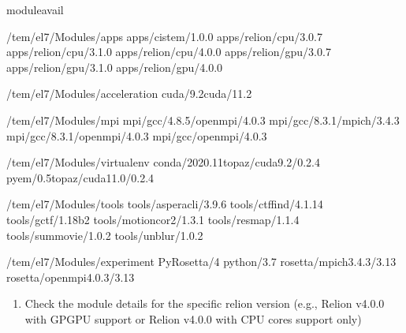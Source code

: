 \documentclass[a4paper,10pt,english]{sphinxmanual}
\begin{document}
\begin{sphinxVerbatim}[commandchars=\\\{\}]
\PYGZdl{}\PYGZgt{}moduleavail

\PYGZhy{}\PYGZhy{}\PYGZhy{}\PYGZhy{}\PYGZhy{}\PYGZhy{}\PYGZhy{}\PYGZhy{}/tem/el7/Modules/apps\PYGZhy{}\PYGZhy{}\PYGZhy{}\PYGZhy{}\PYGZhy{}\PYGZhy{}\PYGZhy{}\PYGZhy{}
apps/cistem/1.0.0
apps/relion/cpu/3.0.7
apps/relion/cpu/3.1.0
apps/relion/cpu/4.0.0
apps/relion/gpu/3.0.7
apps/relion/gpu/3.1.0
apps/relion/gpu/4.0.0

\PYGZhy{}\PYGZhy{}\PYGZhy{}\PYGZhy{}/tem/el7/Modules/acceleration\PYGZhy{}\PYGZhy{}\PYGZhy{}\PYGZhy{}
cuda/9.2cuda/11.2

\PYGZhy{}\PYGZhy{}\PYGZhy{}\PYGZhy{}\PYGZhy{}\PYGZhy{}\PYGZhy{}\PYGZhy{}/tem/el7/Modules/mpi\PYGZhy{}\PYGZhy{}\PYGZhy{}\PYGZhy{}\PYGZhy{}\PYGZhy{}\PYGZhy{}\PYGZhy{}\PYGZhy{}
mpi/gcc/4.8.5/openmpi/4.0.3
mpi/gcc/8.3.1/mpich/3.4.3
mpi/gcc/8.3.1/openmpi/4.0.3
mpi/gcc/openmpi/4.0.3

\PYGZhy{}\PYGZhy{}\PYGZhy{}\PYGZhy{}\PYGZhy{}/tem/el7/Modules/virtualenv\PYGZhy{}\PYGZhy{}\PYGZhy{}\PYGZhy{}\PYGZhy{}
conda/2020.11topaz/cuda\PYGZhy{}9.2/0.2.4
pyem/0.5topaz/cuda\PYGZhy{}11.0/0.2.4

\PYGZhy{}\PYGZhy{}\PYGZhy{}\PYGZhy{}\PYGZhy{}\PYGZhy{}\PYGZhy{}/tem/el7/Modules/tools\PYGZhy{}\PYGZhy{}\PYGZhy{}\PYGZhy{}\PYGZhy{}\PYGZhy{}\PYGZhy{}\PYGZhy{}
tools/aspera\PYGZhy{}cli/3.9.6
tools/ctffind/4.1.14
tools/gctf/1.18\PYGZus{}b2
tools/motioncor2/1.3.1
tools/resmap/1.1.4
tools/summovie/1.0.2
tools/unblur/1.0.2

\PYGZhy{}\PYGZhy{}\PYGZhy{}\PYGZhy{}\PYGZhy{}/tem/el7/Modules/experiment\PYGZhy{}\PYGZhy{}\PYGZhy{}\PYGZhy{}\PYGZhy{}
PyRosetta/4
python/3.7
rosetta/mpich\PYGZhy{}3.4.3/3.13
rosetta/openmpi\PYGZhy{}4.0.3/3.13
\end{sphinxVerbatim}
\begin{enumerate}
%
\setcounter{enumi}{1}
\item {} 
\sphinxAtStartPar
Check the module details for the specific relion version (e.g., Relion v4.0.0 with GPGPU support or Relion v4.0.0 with CPU cores support only)

\end{enumerate}
\end{document}
